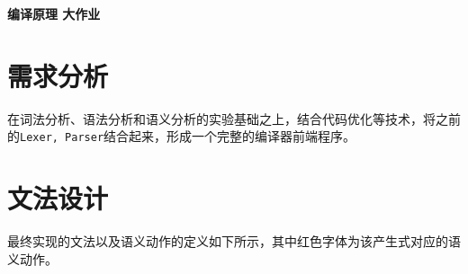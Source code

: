 \documentclass{ML}
\begin{document}
\maketitle

\tableofcontents
\newpage

\begin{center}
    \textbf{ 编译原理 大作业}
\end{center}

\section{需求分析}
在词法分析、语法分析和语义分析的实验基础之上，结合代码优化等技术，将之前的\texttt{Lexer, Parser}结合起来，形成一个完整的编译器前端程序。
\section{文法设计}
最终实现的文法以及语义动作的定义如下所示，其中{\color{red}红色}字体为该产生式对应的语义动作。
\end{document}
